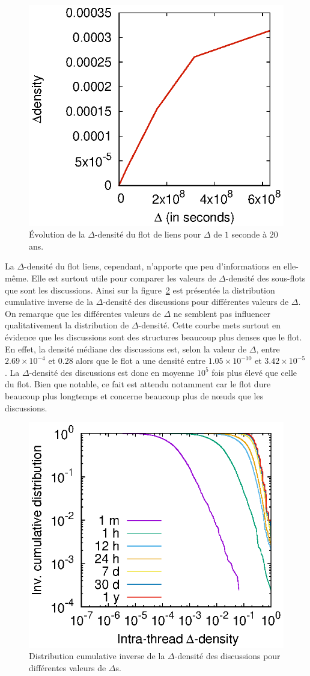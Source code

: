 \begin{figure}
	\centering
	\includegraphics[width=0.48\linewidth]{img/mailing/global_linlin.eps}
	\caption{Évolution de la $\Delta$-densité du flot de liens pour $\Delta$ de $1$ seconde à $20$ ans.}
	\label{fig:dens_fil_discusion}
\end{figure}

La $\Delta$-densité du flot liens, cependant, n'apporte que peu d'informations en elle-même.
Elle est surtout utile pour comparer les valeurs de $\Delta$-densité des sous-flots que sont les discussions.
Ainsi sur la figure~\ref{fig:intra_dens_discussion} est présentée la distribution cumulative inverse de la $\Delta$-densité des discussions pour différentes valeurs de $\Delta$.
On remarque que les différentes valeurs de $\Delta$ ne semblent pas influencer qualitativement la distribution de $\Delta$-densité.
Cette courbe mets surtout en évidence que les discussions sont des structures beaucoup plus denses que le flot.
En effet, la densité médiane des discussions est, selon la valeur de $\Delta$, entre $2.69 \times 10^{-4}$ et $0.28$ alors que le flot a une densité entre $1.05  \times 10^{-10}$ et $3.42 \times 10^{-5}$.
La $\Delta$-densité des discussions est donc en moyenne $10^{5}$ fois plus élevé que celle du flot.
Bien que notable, ce fait est attendu notamment car le flot dure beaucoup plus longtemps et concerne beaucoup plus de n\oe uds que les discussions.
\begin{figure}
\centering
	\includegraphics[width=0.48\linewidth]{img/mailing/delta.eps}

\caption{Distribution cumulative inverse de la $\Delta$-densité des discussions pour différentes valeurs de $\Delta$s.}
\label{fig:intra_dens_discussion}
\end{figure}

